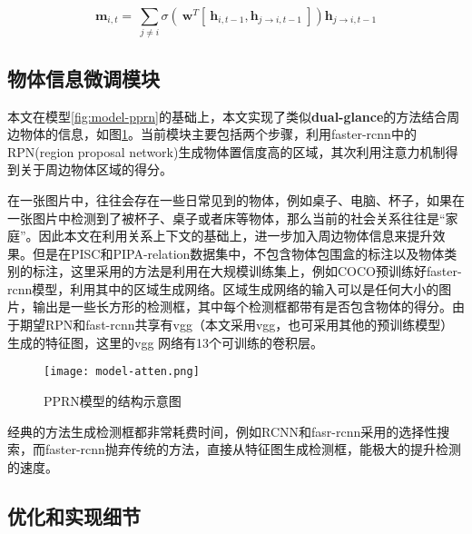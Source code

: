\begin{equation}
    \label{eq:model-mp-atten}
	\bm{m}_{i,t} = ~\sum_{j\neq i} \sigma{(~\bm{w}^T[~\bm{h}_{i,t-1},\bm{h}_{j \to i,t-1}~]) \bm{h}_{j \to i,t-1}}	
\end{equation}



\subsection{物体信息微调模块}

本文在模型\ref{fig:model-pprn}的基础上，本文实现了类似\textbf{dual-glance}的方法结合周边物体的信息，如图\ref{fig:model-atten}。当前模块主要包括两个步骤，利用faster-rcnn中的RPN(region proposal network)生成物体置信度高的区域，其次利用注意力机制得到关于周边物体区域的得分。

在一张图片中，往往会存在一些日常见到的物体，例如桌子、电脑、杯子，如果在一张图片中检测到了被杯子、桌子或者床等物体，那么当前的社会关系往往是``家庭''。因此本文在利用关系上下文的基础上，进一步加入周边物体信息来提升效果。但是在PISC和PIPA-relation数据集中，不包含物体包围盒的标注以及物体类别的标注，这里采用的方法是利用在大规模训练集上，例如COCO\cite{lin2014microsoft}预训练好faster-rcnn模型，利用其中的区域生成网络。区域生成网络的输入可以是任何大小的图片，输出是一些长方形的检测框，其中每个检测框都带有是否包含物体的得分。由于期望RPN和fast-rcnn共享有vgg\cite{simonyan2015very}（本文采用vgg，也可采用其他的预训练模型）生成的特征图，这里的vgg 网络有13个可训练的卷积层。
\begin{figure}[htpb]
	\centering
	\texttt{[image: model-atten.png]}
    \caption{PPRN模型的结构示意图}
	\vspace*{-3.5mm}
	\label{fig:model-atten}
\end{figure}

经典的方法生成检测框都非常耗费时间，例如RCNN和fasr-rcnn采用的选择性搜索，而faster-rcnn抛弃传统的方法，直接从特征图生成检测框，能极大的提升检测的速度。


\subsection{优化和实现细节}


